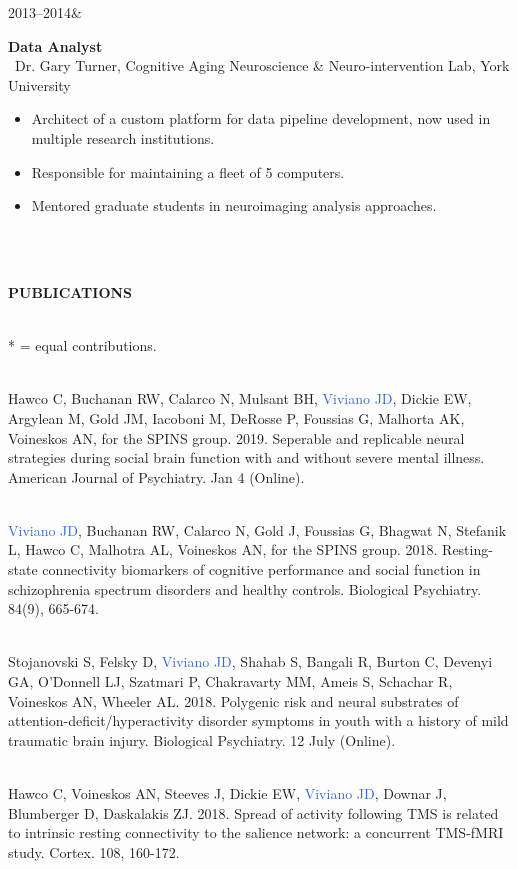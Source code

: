 \documentclass[a4paper,11pt,oneside]{book}
\newcommand{\entry}[4]{%
  \parbox[t]{3cm}{\hfill#1&}\hspace{1cm}\parbox[t]{10.65cm}{%
    \textbf{#2}%
    \hfill%
    {\footnotesize\addfontfeature{Color=lightgray} #3}\\%
    \begin{itemize}[leftmargin=0in]#4\end{itemize}\vspace{\parsep}%
  }}
\newcommand\sectionheading{
    \normalsize
    \noindent
    \leftskip=0in
    \textbf
}
\begin{document}
\begin{flushleft}
\entry
{2013--2014}
{Data Analyst}
{\\\
Dr. Gary Turner, Cognitive Aging Neuroscience \& Neuro-intervention Lab, York University}
{
\item Architect of a custom platform for data pipeline development, now used in multiple research institutions.
\item Responsible for maintaining a fleet of 5 computers.
\item Mentored graduate students in neuroimaging analysis approaches.
} \\\

\sectionheading{PUBLICATIONS} \\\

* = equal contributions. \\\

Hawco C, Buchanan RW, Calarco N, Mulsant BH, \textcolor{highlight}{Viviano JD}, Dickie EW, Argylean M, Gold JM, Iacoboni M, DeRosse P, Foussias G, Malhorta AK, Voineskos AN, for the SPINS group. 2019. Seperable and replicable neural strategies during social brain function with and without severe mental illness. American Journal of Psychiatry. Jan 4 (Online). \\\

\textcolor{highlight}{Viviano JD}, Buchanan RW, Calarco N, Gold J, Foussias G, Bhagwat N, Stefanik L, Hawco C, Malhotra AL, Voineskos AN, for the SPINS group. 2018. Resting-state connectivity biomarkers of cognitive performance and social function in schizophrenia spectrum disorders and healthy controls. Biological Psychiatry. 84(9), 665-674.  \\\

Stojanovski S, Felsky D, \textcolor{highlight}{Viviano JD}, Shahab S, Bangali R, Burton C, Devenyi GA, O'Donnell LJ, Szatmari P, Chakravarty MM, Ameis S, Schachar R, Voineskos AN, Wheeler AL. 2018. Polygenic risk and neural substrates of attention-deficit/hyperactivity disorder symptoms in youth with a history of mild traumatic brain injury. Biological Psychiatry. 12 July (Online). \\\

Hawco C, Voineskos AN,  Steeves J, Dickie EW, \textcolor{highlight}{Viviano JD}, Downar J, Blumberger D, Daskalakis ZJ. 2018. Spread of activity following TMS is related to intrinsic resting connectivity to the salience network: a concurrent TMS-fMRI study. Cortex. 108, 160-172. \\\


\end{flushleft}
\end{document}
